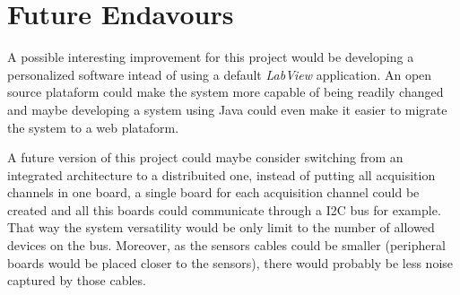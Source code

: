 	\section{Future Endavours}\label{sec:future-endavours}
		A possible interesting improvement for this project would be developing a personalized software intead of using a default \textit{LabView} application. An open source plataform could make the system more capable of being readily changed and maybe developing a system using Java could even make it easier to migrate the system to a web plataform.
		\par
		A future version of this project could maybe consider switching from an integrated architecture to a distribuited one, instead of putting all acquisition channels in one board, a single board for each acquisition channel could be created and all this boards could communicate through a I2C bus for example. That way the system versatility would be only limit to the number of allowed devices on the bus. Moreover, as the sensors cables could be smaller (peripheral boards would be placed closer to the sensors), there would probably be less noise captured by those cables.

